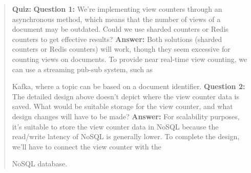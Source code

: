 \begin{quote}
\textbf{Quiz:}
\textbf{Question 1:} We're implementing view counters through an asynchronous method, which means that the number of views of a document may be outdated. Could we use sharded counters or Redis counters to get effective results?
\textbf{Answer:} Both solutions (sharded counters or Redis counters) will work, though they seem excessive for counting views on documents. To provide near real-time view counting, we can use a streaming pub-sub system, such as

Kafka, where a topic can be based on a document identifier.
\textbf{Question 2:} The detailed design above doesn't depict where the view counter data is saved. What would be suitable storage for the view counter, and what design changes will have to be made?
\textbf{Answer:} For scalability purposes, it's suitable to store the view counter data in NoSQL because the read/write latency of NoSQL is generally lower. To complete the design, we'll have to connect the view counter with the

NoSQL database.
\end{quote}

